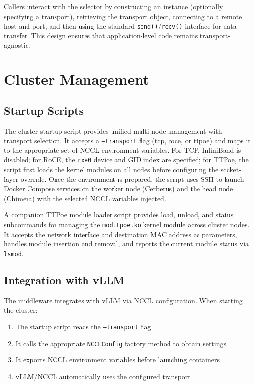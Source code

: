 \documentclass[10pt,letterpaper]{article}
\begin{document}
Callers interact with the selector by constructing an instance (optionally specifying a transport), retrieving the transport object, connecting to a remote host and port, and then using the standard \texttt{send()}/\texttt{recv()} interface for data transfer. This design ensures that application-level code remains transport-agnostic.

\section{Cluster Management}

\subsection{Startup Scripts}

The cluster startup script provides unified multi-node management with transport selection. It accepts a \texttt{--transport} flag (tcp, roce, or ttpoe) and maps it to the appropriate set of NCCL environment variables. For TCP, InfiniBand is disabled; for RoCE, the \texttt{rxe0} device and GID index are specified; for TTPoe, the script first loads the kernel modules on all nodes before configuring the socket-layer override. Once the environment is prepared, the script uses SSH to launch Docker Compose services on the worker node (Cerberus) and the head node (Chimera) with the selected NCCL variables injected.

A companion TTPoe module loader script provides load, unload, and status subcommands for managing the \texttt{modttpoe.ko} kernel module across cluster nodes. It accepts the network interface and destination MAC address as parameters, handles module insertion and removal, and reports the current module status via \texttt{lsmod}.

\subsection{Integration with vLLM}

The middleware integrates with vLLM via NCCL configuration. When starting the cluster:

\begin{enumerate}[noitemsep]
    \item The startup script reads the \texttt{--transport} flag
    \item It calls the appropriate \texttt{NCCLConfig} factory method to obtain settings
    \item It exports NCCL environment variables before launching containers
    \item vLLM/NCCL automatically uses the configured transport
\end{enumerate}
\end{document}
